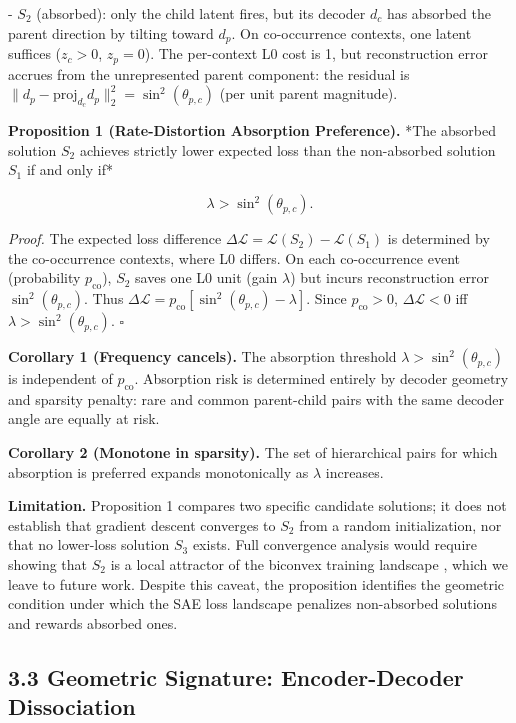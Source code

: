 \documentclass{article}
\begin{document}
- $S_2$ (absorbed): only the child latent fires, but its decoder $d_c$ has absorbed the
  parent direction by tilting toward $d_p$. On co-occurrence contexts, one latent suffices
  ($z_c > 0$, $z_p = 0$). The per-context L0 cost is 1, but reconstruction error accrues
  from the unrepresented parent component: the residual is $\|d_p - \mathrm{proj}_{d_c}
  d_p\|_2^2 = \sin^2(\theta_{p,c})$ (per unit parent magnitude).

\textbf{Proposition 1 (Rate-Distortion Absorption Preference).} *The absorbed solution $S_2$
achieves strictly lower expected loss than the non-absorbed solution $S_1$ if and only if*

$$\boxed{\lambda > \sin^2(\theta_{p,c}).}$$

\textit{Proof.} The expected loss difference $\Delta\mathcal{L} = \mathcal{L}(S_2) - \mathcal{L}(S_1)$
is determined by the co-occurrence contexts, where L0 differs. On each co-occurrence event
(probability $p_\text{co}$), $S_2$ saves one L0 unit (gain $\lambda$) but incurs
reconstruction error $\sin^2(\theta_{p,c})$. Thus
$\Delta\mathcal{L} = p_\text{co}[\sin^2(\theta_{p,c}) - \lambda]$.
Since $p_\text{co} > 0$, $\Delta\mathcal{L} < 0$ iff $\lambda > \sin^2(\theta_{p,c})$. $\square$

\textbf{Corollary 1 (Frequency cancels).} The absorption threshold $\lambda > \sin^2(\theta_{p,c})$
is independent of $p_\text{co}$. Absorption risk is determined entirely by decoder geometry
and sparsity penalty: rare and common parent-child pairs with the same decoder angle are
equally at risk.

\textbf{Corollary 2 (Monotone in sparsity).} The set of hierarchical pairs for which absorption
is preferred expands monotonically as $\lambda$ increases.

\textbf{Limitation.} Proposition 1 compares two specific candidate solutions; it does not
establish that gradient descent converges to $S_2$ from a random initialization, nor that
no lower-loss solution $S_3$ exists. Full convergence analysis would require showing that
$S_2$ is a local attractor of the biconvex training landscape \citep{tang2025saerd}, which
we leave to future work. Despite this caveat, the proposition identifies the geometric
condition under which the SAE loss landscape penalizes non-absorbed solutions and rewards
absorbed ones.


\subsection{3.3 Geometric Signature: Encoder-Decoder Dissociation}
\end{document}
